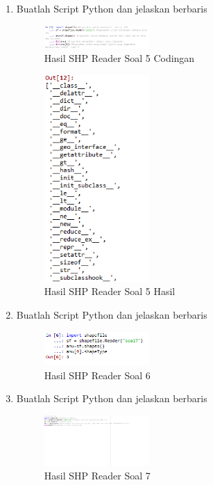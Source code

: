 \begin{enumerate}
    \item Buatlah Script Python dan jelaskan berbaris
    
    \hfill\break
    \begin{figure}[H]
		\includegraphics[width=4cm]{figures/1174003/3/5.png}
		\centering
		\caption{Hasil SHP Reader Soal 5 Codingan}
    \end{figure}

    \hfill\break
    \begin{figure}[H]
		\includegraphics[width=4cm]{figures/1174003/3/5_out.png}
		\centering
		\caption{Hasil SHP Reader Soal 5 Hasil}
    \end{figure}
    
    \item Buatlah Script Python dan jelaskan berbaris
    
    \hfill\break
    \begin{figure}[H]
		\includegraphics[width=4cm]{figures/1174003/3/6.png}
		\centering
		\caption{Hasil SHP Reader Soal 6}
    \end{figure}

    \item Buatlah Script Python dan jelaskan berbaris
    
    \hfill\break
    \begin{figure}[H]
		\includegraphics[width=4cm]{figures/1174003/3/7.png}
		\centering
		\caption{Hasil SHP Reader Soal 7}
    \end{figure}


\end{enumerate}
